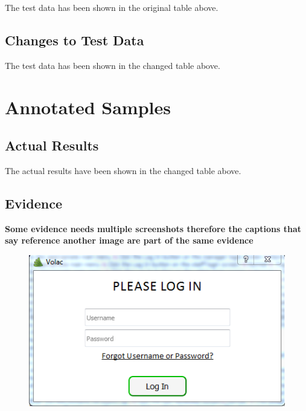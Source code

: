 \begin{landscape}
The test data has been shown in the original table above.

\subsection{Changes to Test Data}

The test data has been shown in the changed table above.

\section{Annotated Samples}

\subsection{Actual Results}

The actual results have been shown in the changed table above.

\end{landscape}

\subsection{Evidence}

\textbf{Some evidence needs multiple screenshots therefore the captions that say reference another image are part of the same evidence}
\

\begin{figure}[H]
    \includegraphics[width=\textwidth]{./Testing/Images/LoginScreen.png}
    \label{fig:LoginScreen}
\end{figure}

